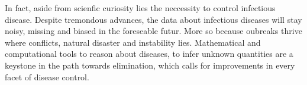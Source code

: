 In fact, aside from scienfic curiosity lies the neccessity to control infectious disease. Despite tremondous advances, the data about infectious diseases will stay noisy, missing and biased in the foreseable futur. More so because oubreaks thrive where conflicts, natural disaster and instability lies. Mathematical and computational tools to reason about diseases, to infer unknown quantities are a keystone in the path towards elimination, which calls for improvements in every facet of disease control. 

